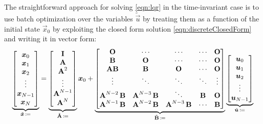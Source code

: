			The straightforward approach for solving \eqref{eqn:lqr} in the time-invariant case is to use batch optimization over the variables \(\tilde{\vec{u}}\) by treating them as a function of the initial state \(\vec{x}_0\) by exploiting the closed form solution \eqref{eqn:discreteClosedForm} and writing it in vector form:
			\begin{equation}
				\underbrace{\begin{bmatrix}
					\bm{x}_0 \\
					\bm{x}_1 \\
					\bm{x}_2 \\
					\vdots \\
					\bm{x}_{N - 1} \\
					\bm{x}_N
				\end{bmatrix}}_{\tilde{\bm{x}} \,\coloneqq}
				=
				\underbrace{\begin{bmatrix}
					\bm{\mathrm{I}} \\
					\bm{\mathrm{A}} \\
					\bm{\mathrm{A}}^2 \\
					\vdots \\
					\bm{\mathrm{A}}^{N - 1} \\
					\bm{\mathrm{A}}^N
				\end{bmatrix}}_{\tilde{\bm{\mathrm{A}}} \,\coloneqq}
				\bm{x}_0
				+
				\underbrace{\begin{bmatrix}
					\bm{\mathrm{O}}                   & \cdots                    & \cdots                    & \cdots  & \bm{\mathrm{O}} \\
					\bm{\mathrm{B}}                   & \bm{\mathrm{O}}                   & \cdots                    & \cdots  & \bm{\mathrm{O}} \\
					\bm{\mathrm{A}} \bm{\mathrm{B}}           & \bm{\mathrm{B}}                   & \bm{\mathrm{O}}                   & \cdots  & \bm{\mathrm{O}} \\
					\vdots                    & \ddots                    & \ddots                    & \ddots  & \vdots  \\
					\bm{\mathrm{A}}^{N - 2}\, \bm{\mathrm{B}} & \bm{\mathrm{A}}^{N - 3}\, \bm{\mathrm{B}} & \ddots                    & \bm{\mathrm{B}} & \bm{\mathrm{O}} \\
					\bm{\mathrm{A}}^{N - 1}\, \bm{\mathrm{B}} & \bm{\mathrm{A}}^{N - 2}\, \bm{\mathrm{B}} & \bm{\mathrm{A}}^{N - 3}\, \bm{\mathrm{B}} & \cdots  & \bm{\mathrm{B}}
				\end{bmatrix}}_{\tilde{\bm{\mathrm{B}}} \,\coloneqq}
				\underbrace{\begin{bmatrix}
					\bm{u}_0 \\
					\bm{u}_1 \\
					\bm{u}_2 \\
					\vdots \\
					\bm{u}_{N - 1}
				\end{bmatrix}}_{\tilde{\bm{u}} \,\coloneqq}
			\end{equation}
